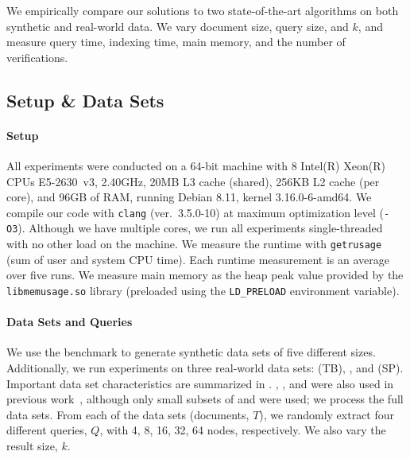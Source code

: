\newcommand\expplotheight{3.5cm}

We empirically compare our solutions to two state-of-the-art algorithms on both
synthetic and real-world data. We vary document size, query size, and $k$, and
measure query time, indexing time, main memory, and the number of verifications.

\subsection{Setup \& Data Sets}
\label{subsec:empirical-evaluation-setup-data-sets}

\paragraph{Setup}

All experiments were conducted on a 64-bit machine with 8 Intel(R) Xeon(R) CPUs E5-2630~v3, 2.40GHz, 20MB L3 cache (shared), 256KB L2 cache (per core), and 96GB of RAM, running Debian 8.11, kernel 3.16.0-6-amd64. We compile our code with \texttt{clang} (ver.\ 3.5.0-10) at maximum optimization level (\texttt{-O3}).
%
Although we have multiple cores, we run all experiments single-threaded with no other load on the machine.  We measure the runtime with \texttt{getrusage} (sum of user and system CPU time). Each runtime measurement is an average over five runs.  We measure main memory as the heap peak value provided by the \texttt{libmemusage.so} library (preloaded using the \texttt{\small LD\_PRELOAD} environment variable).

\paragraph{Data Sets and Queries}

We use the \xmark{} benchmark to generate synthetic data sets of five different sizes. Additionally, we run experiments on three real-world data sets: \treebank{} (TB), \dblp{}, and \swissprot{} (SP). Important data set characteristics are summarized in . \xmark{}, \dblp{}, and \swissprot{} were also used in previous work~\cite{cohen-sigmod-2013}, although only small subsets of \dblp{} and \swissprot{} were used; we process the full data sets. From each of the data sets (documents, $T$), we randomly extract four different queries, $Q$, with 4, 8, 16, 32, 64 nodes, respectively. We also vary the result size, $k$.

